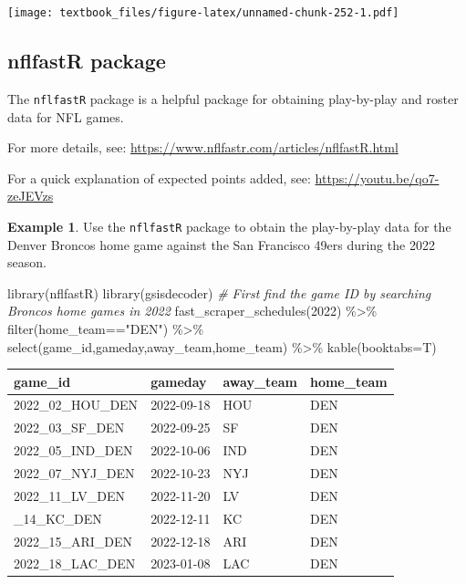 \documentclass[
  11pt,
]{book}
\newenvironment{Shaded}{\begin{snugshade}}{\end{snugshade}}
\newcommand{\AttributeTok}[1]{\textcolor[rgb]{0.77,0.63,0.00}{#1}}
\newcommand{\CommentTok}[1]{\textcolor[rgb]{0.56,0.35,0.01}{\textit{#1}}}
\newcommand{\DecValTok}[1]{\textcolor[rgb]{0.00,0.00,0.81}{#1}}
\newcommand{\FunctionTok}[1]{\textcolor[rgb]{0.00,0.00,0.00}{#1}}
\newcommand{\NormalTok}[1]{#1}
\newcommand{\SpecialCharTok}[1]{\textcolor[rgb]{0.00,0.00,0.00}{#1}}
\newcommand{\StringTok}[1]{\textcolor[rgb]{0.31,0.60,0.02}{#1}}
\theoremstyle{definition}
\theoremstyle{definition}
\newtheorem{example}{Example}[chapter]
\theoremstyle{definition}
\theoremstyle{definition}
\theoremstyle{remark}
\begin{document}
\texttt{[image: textbook\_files/figure-latex/unnamed-chunk-252-1.pdf]}

\newpage

\hypertarget{nflfastr-package}{%
\subsection{nflfastR package}\label{nflfastr-package}}

The \texttt{nflfastR} package is a helpful package for obtaining play-by-play and roster data for NFL games.

For more details, see: \url{https://www.nflfastr.com/articles/nflfastR.html}

For a quick explanation of expected points added, see: \url{https://youtu.be/qo7-zeJEVzs}

\begin{example}
Use the \texttt{nflfastR} package to obtain the play-by-play data for the Denver Broncos home game against the San Francisco 49ers during the 2022 season.
\end{example}

\begin{Shaded}
\begin{Highlighting}[]
\FunctionTok{library}\NormalTok{(nflfastR)}
\FunctionTok{library}\NormalTok{(gsisdecoder)}
\CommentTok{\# First find the game ID by searching Broncos home games in 2022}
\FunctionTok{fast\_scraper\_schedules}\NormalTok{(}\DecValTok{2022}\NormalTok{) }\SpecialCharTok{\%\textgreater{}\%}
  \FunctionTok{filter}\NormalTok{(home\_team}\SpecialCharTok{==}\StringTok{"DEN"}\NormalTok{) }\SpecialCharTok{\%\textgreater{}\%}
  \FunctionTok{select}\NormalTok{(game\_id,gameday,away\_team,home\_team) }\SpecialCharTok{\%\textgreater{}\%}
  \FunctionTok{kable}\NormalTok{(}\AttributeTok{booktabs=}\NormalTok{T)}
\end{Highlighting}
\end{Shaded}

\begin{tabular}{llll}
\toprule
game\_id & gameday & away\_team & home\_team\\
\midrule
2022\_02\_HOU\_DEN & 2022-09-18 & HOU & DEN\\
2022\_03\_SF\_DEN & 2022-09-25 & SF & DEN\\
2022\_05\_IND\_DEN & 2022-10-06 & IND & DEN\\
2022\_07\_NYJ\_DEN & 2022-10-23 & NYJ & DEN\\
2022\_11\_LV\_DEN & 2022-11-20 & LV & DEN\\
\addlinespace
2022\_14\_KC\_DEN & 2022-12-11 & KC & DEN\\
2022\_15\_ARI\_DEN & 2022-12-18 & ARI & DEN\\
2022\_18\_LAC\_DEN & 2023-01-08 & LAC & DEN\\
\bottomrule
\end{tabular}
\end{document}
